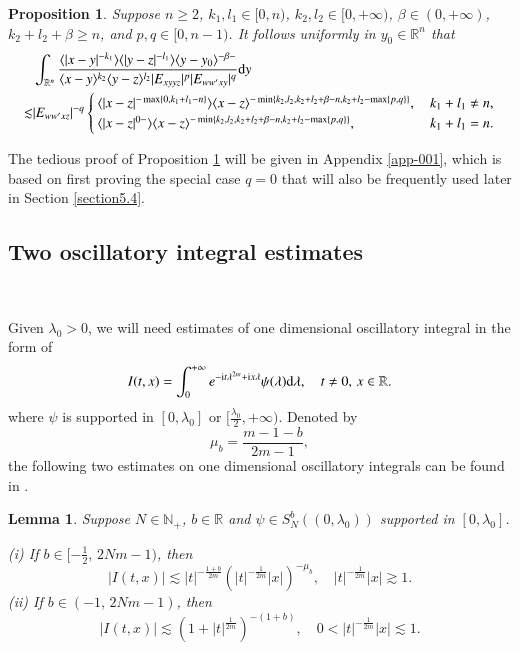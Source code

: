 \documentclass[11pt,reqno]{amsart}
\def\d{{\rm d}}
\def\i{{\rm i}}
\newtheorem{proposition}[theorem]{Proposition}
\newtheorem{lemma}[theorem]{Lemma}
\numberwithin{equation}{section}
\theoremstyle{definition}
\begin{document}
\begin{proposition}\label{twoline}
	Suppose $n\geq2$, $k_1,l_1\in[0,n)$, $k_2,l_2\in[0,+\infty)$, $\beta\in(0,+\infty)$, $k_2+l_2+\beta\geq n$, and $p,q\in[0,n-1)$. It follows uniformly in $y_0\in\mathbb{R}^n$ that
	\begin{equation*}\label{l15}
		\begin{split}
			&\int_{\mathbb{R}^n}\frac{\langle|x-y|^{-k_1}\rangle\langle|y-z|^{-l_1}\rangle\langle y-y_0\rangle^{-\beta-}}{\langle x-y\rangle^{k_2}\langle y-z\rangle^{l_2}|E_{xyyz}|^p|E_{ww'xy}|^q}\d y\\
			\lesssim&|E_{ww'xz}|^{-q}\begin{cases}
				\langle|x-z|^{-\max\{0,k_1+l_1-n\}}\rangle\langle x-z\rangle^{-\min\{k_2,l_2,k_2+l_2+\beta-n,k_2+l_2-\max\{p,q\}\}},\,&k_1+l_1\neq n,\\
				\langle|x-z|^{0-}\rangle\langle x-z\rangle^{-\min\{k_2,l_2,k_2+l_2+\beta-n,k_2+l_2-\max\{p,q\}\}},&k_1+l_1=n.
			\end{cases}
		\end{split}
	\end{equation*}
\end{proposition}

The tedious proof of Proposition \ref{twoline} will be given in Appendix \ref{app-001}, which is based on first proving the special case $q=0$ that will also be frequently used later in Section \ref{section5.4}.



\subsection{Two oscillatory integral estimates}\

Given $\lambda_0>0$, we will need estimates of one dimensional oscillatory integral in the form of
\begin{equation*}
	I(t,x)=\int_0^{+\infty}e^{-\i t\lambda^{2m}+\i x\lambda}\psi(\lambda)\d\lambda,\quad t\neq0,\,x\in\mathbb{R}.
\end{equation*}
where $\psi$ is supported in $[0,\lambda_0]$ or $[\frac{\lambda_0}{2},+\infty)$. Denoted by
\begin{equation}\label{mu}
	\mbox{$\mu_b=\frac{m-1-b}{2m-1}$},
\end{equation}
the following two estimates on one dimensional oscillatory integrals can be found in \cite{HHZ}.

\begin{lemma}\label{lemmaA.2}
	Suppose $N\in\mathbb{N}_+$, $b\in\mathbb{R}$ and $\psi\in S_N^b((0,\lambda_0))$ supported in $[0,\lambda_0]$.
	
	\noindent (i) If $b\in[-\frac{1}{2},\, 2Nm-1)$, then
	\begin{equation}\label{eqA.4}
		|I(t,x)|\lesssim
		|t|^{-\frac{1+b}{2m}}(|t|^{-\frac{1}{2m}}|x|)^{-\mu_b},\quad |t|^{-\frac{1}{2m}}|x|\gtrsim1.
	\end{equation}
	\noindent (ii) If $b\in(-1,\, 2Nm-1)$, then
	\begin{equation}\label{eqA.5}
		|I(t,x)|\lesssim(1+|t|^{\frac{1}{2m}})^{-(1+b)},\quad 0<|t|^{-\frac{1}{2m}}|x|\lesssim1.
	\end{equation}
\end{lemma}
\end{document}
